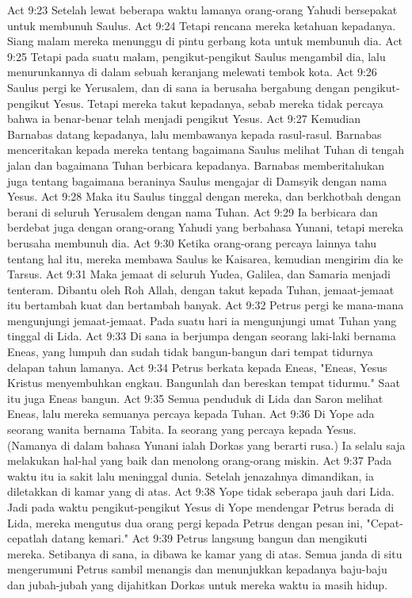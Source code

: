 Act 9:23  Setelah lewat beberapa waktu lamanya orang-orang Yahudi bersepakat untuk membunuh Saulus.
Act 9:24  Tetapi rencana mereka ketahuan kepadanya. Siang malam mereka menunggu di pintu gerbang kota untuk membunuh dia.
Act 9:25  Tetapi pada suatu malam, pengikut-pengikut Saulus mengambil dia, lalu menurunkannya di dalam sebuah keranjang melewati tembok kota.
Act 9:26  Saulus pergi ke Yerusalem, dan di sana ia berusaha bergabung dengan pengikut-pengikut Yesus. Tetapi mereka takut kepadanya, sebab mereka tidak percaya bahwa ia benar-benar telah menjadi pengikut Yesus.
Act 9:27  Kemudian Barnabas datang kepadanya, lalu membawanya kepada rasul-rasul. Barnabas menceritakan kepada mereka tentang bagaimana Saulus melihat Tuhan di tengah jalan dan bagaimana Tuhan berbicara kepadanya. Barnabas memberitahukan juga tentang bagaimana beraninya Saulus mengajar di Damsyik dengan nama Yesus.
Act 9:28  Maka itu Saulus tinggal dengan mereka, dan berkhotbah dengan berani di seluruh Yerusalem dengan nama Tuhan.
Act 9:29  Ia berbicara dan berdebat juga dengan orang-orang Yahudi yang berbahasa Yunani, tetapi mereka berusaha membunuh dia.
Act 9:30  Ketika orang-orang percaya lainnya tahu tentang hal itu, mereka membawa Saulus ke Kaisarea, kemudian mengirim dia ke Tarsus.
Act 9:31  Maka jemaat di seluruh Yudea, Galilea, dan Samaria menjadi tenteram. Dibantu oleh Roh Allah, dengan takut kepada Tuhan, jemaat-jemaat itu bertambah kuat dan bertambah banyak.
Act 9:32  Petrus pergi ke mana-mana mengunjungi jemaat-jemaat. Pada suatu hari ia mengunjungi umat Tuhan yang tinggal di Lida.
Act 9:33  Di sana ia berjumpa dengan seorang laki-laki bernama Eneas, yang lumpuh dan sudah tidak bangun-bangun dari tempat tidurnya delapan tahun lamanya.
Act 9:34  Petrus berkata kepada Eneas, "Eneas, Yesus Kristus menyembuhkan engkau. Bangunlah dan bereskan tempat tidurmu." Saat itu juga Eneas bangun.
Act 9:35  Semua penduduk di Lida dan Saron melihat Eneas, lalu mereka semuanya percaya kepada Tuhan.
Act 9:36  Di Yope ada seorang wanita bernama Tabita. Ia seorang yang percaya kepada Yesus. (Namanya di dalam bahasa Yunani ialah Dorkas yang berarti rusa.) Ia selalu saja melakukan hal-hal yang baik dan menolong orang-orang miskin.
Act 9:37  Pada waktu itu ia sakit lalu meninggal dunia. Setelah jenazahnya dimandikan, ia diletakkan di kamar yang di atas.
Act 9:38  Yope tidak seberapa jauh dari Lida. Jadi pada waktu pengikut-pengikut Yesus di Yope mendengar Petrus berada di Lida, mereka mengutus dua orang pergi kepada Petrus dengan pesan ini, "Cepat-cepatlah datang kemari."
Act 9:39  Petrus langsung bangun dan mengikuti mereka. Setibanya di sana, ia dibawa ke kamar yang di atas. Semua janda di situ mengerumuni Petrus sambil menangis dan menunjukkan kepadanya baju-baju dan jubah-jubah yang dijahitkan Dorkas untuk mereka waktu ia masih hidup.
